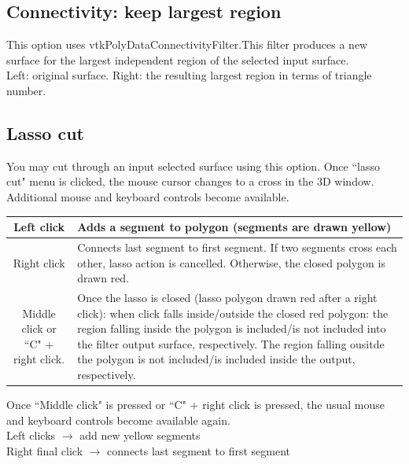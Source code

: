 \subsection{Connectivity: keep largest region}
This option uses vtkPolyDataConnectivityFilter.This filter produces a new surface for the largest independent region of the selected input surface.\\

Left: original surface. Right: the resulting largest region in terms of triangle number.

\subsection{Lasso cut}
You may cut through an input selected surface using this option. Once ``lasso cut" menu is clicked, the mouse cursor changes to a cross in the 3D window. Additional mouse and keyboard controls become available.\\

\begin{tabularx}{\linewidth}{ | c | X | }
\hline			
Left click & Adds a segment to polygon (segments are drawn yellow) \\ \hline			

Right click & Connects last segment to first segment. If two segments cross each other, lasso action is cancelled. Otherwise, the closed polygon is drawn red.\\ \hline			

Middle click or ``C" + right click. & Once the lasso is closed (lasso polygon drawn red
after a right click):\newline
when click falls inside/outside the closed red polygon: the region falling inside the polygon is included/is not included into the filter output surface, respectively. The region falling ousitde the polygon is not included/is included inside the output, respectively.

\\ \hline	
			
	
\end{tabularx}

Once ``Middle click" is pressed or ``C" + right click is pressed, the usual mouse and keyboard controls become available again.\\

Left clicks $\rightarrow$ add new yellow segments\\

Right final click $\rightarrow$ connects last segment to first segment\\

